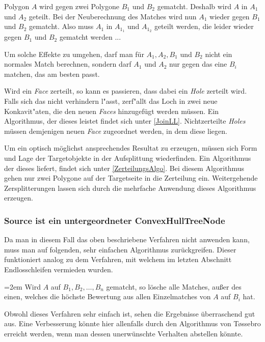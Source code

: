 Polygon $A$ wird gegen zwei Polygone $B_1$ und $B_2$ gematcht. Deshalb wird $A$ in $A_1$ und $A_2$ geteilt. Bei der Neuberechnung des Matches wird nun $A_1$ wieder gegen $B_1$  und $B_2$ gematcht. Also muss $A_1$ in $A_{1_1}$ und $A_{1_2}$ geteilt werden, die leider wieder gegen $B_1$ und $B_2$ gematcht werden ...

Um solche Effekte zu umgehen, darf man für $A_1, A_2,B_1$ und $B_2$ nicht ein normales Match berechnen, sondern darf $A_1$ und $A_2$ nur gegen das eine $B_i$ matchen, das am besten passt. 

Wird ein \textit{Face} zerteilt, so kann es passieren, dass dabei ein \textit{Hole} zerteilt wird. Falls sich das nicht verhindern l"asst, zerf"allt das Loch in zwei neue Konkavit"aten, die den neuen \textit{Faces} hinzugefügt werden müssen. Ein Algorithmus, der dieses leistet findet sich unter \vref{JoinLL}. Nichtzerteilte \textit{Holes} müssen demjenigen neuen \textit{Face} zugeordnet werden, in dem diese liegen.

Um ein optisch möglichst ansprechendes Resultat zu erzeugen, müssen sich Form und Lage der Targetobjekte in der Aufsplittung wiederfinden. Ein Algorithmus der dieses liefert, findet sich unter \vref{ZerteilungsAlgo}. Bei diesem Algorithmus gehen nur zwei Polygone auf der Targetseite in die Zerteilung ein. Weitergehende Zersplitterungen lassen sich durch die mehrfache Anwendung dieses Algorithmus erzeugen.

\subsubsection*{Source ist ein untergeordneter ConvexHullTreeNode}

Da man in diesem Fall das oben beschriebene Verfahren nicht anwenden kann, muss man auf folgenden, sehr einfachen Algorithmus zurückgreifen. Dieser  funktioniert analog zu dem Verfahren, mit welchem im letzten Abschnitt Endlosschleifen vermieden wurden.

\par
\begingroup
\leftskip=2em 
Wird $A$ auf  $B_1,B_2, \hdots ,B_n$ gematcht, so lösche alle Matches, außer des einen, welches die höchste Bewertung aus allen Einzelmatches von $A$ auf $B_i$ hat.
\par
\endgroup


Obwohl dieses Verfahren sehr einfach ist, sehen die Ergebnisse überraschend gut aus. Eine Verbesserung könnte hier allenfalls durch den Algorithmus von T\o{}ssebro erreicht werden, wenn man dessen unerwünschte Verhalten abstellen könnte.

